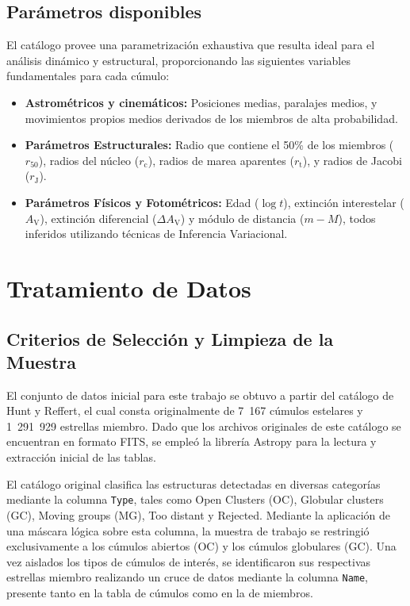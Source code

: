     \subsection{Parámetros disponibles}
        
        El catálogo provee una parametrización exhaustiva que resulta ideal para 
        el análisis dinámico y estructural, proporcionando las siguientes 
        variables fundamentales para cada cúmulo:

        \begin{itemize}
            \item \textbf{Astrométricos y cinemáticos:} Posiciones medias, 
            paralajes medios, y movimientos propios medios derivados de los 
            miembros de alta probabilidad.

            \item \textbf{Parámetros Estructurales:} Radio que contiene el 50\% 
            de los miembros ($r_{50}$), radios del núcleo ($r_\text{c}$), radios 
            de marea aparentes ($r_\text{t}$), y radios de Jacobi 
            ($r_\text{J}$).

            \item \textbf{Parámetros Físicos y Fotométricos:} Edad ($\log t$), 
            extinción interestelar ($A_\text{V}$), extinción diferencial 
            ($\Delta A_\text{V}$) y módulo de distancia ($m-M$), todos inferidos 
            utilizando técnicas de Inferencia Variacional.
        \end{itemize}

\section{Tratamiento de Datos}

        \subsection{Criterios de Selección y Limpieza de la Muestra}

            El conjunto de datos inicial para este trabajo se obtuvo a partir 
            del catálogo de Hunt y Reffert, el cual consta originalmente de 
            7~167 cúmulos estelares y 1~291~929 estrellas miembro. Dado que los 
            archivos originales de este catálogo se encuentran en formato FITS, 
            se empleó la librería Astropy para la lectura y extracción inicial 
            de las tablas.

            El catálogo original clasifica las estructuras detectadas en 
            diversas categorías mediante la columna \texttt{Type}, tales como 
            Open Clusters (OC), Globular clusters (GC), Moving groups (MG), Too 
            distant y Rejected. Mediante la aplicación de una máscara lógica 
            sobre esta columna, la muestra de trabajo se restringió 
            exclusivamente a los cúmulos abiertos (OC) y los cúmulos globulares 
            (GC). Una vez aislados los tipos de cúmulos de interés, se 
            identificaron sus respectivas estrellas miembro realizando un cruce 
            de datos mediante la columna \texttt{Name}, presente tanto en la 
            tabla de cúmulos como en la de miembros.

